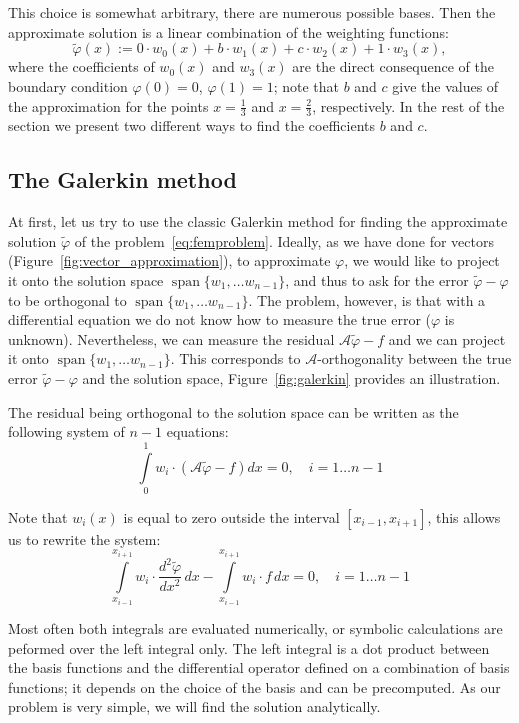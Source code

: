 \documentclass[notitlepage,oneside]{book}
\DeclareMathOperator{\Span}{span}
\begin{document}
This choice is somewhat arbitrary, there are numerous possible bases.
Then the approximate solution is a linear combination of the weighting functions:
\begin{equation}
\label{eq:tildephi}
\tilde{\varphi}(x) := 0\cdot w_0(x) + b\cdot w_1(x) + c\cdot w_2(x) + 1\cdot w_3(x),
\end{equation}
where the coefficients of $w_0(x)$ and $w_3(x)$ are the direct consequence of the boundary condition $\varphi(0)=0$, $\varphi(1)=1$;
note that $b$ and $c$ give the values of the approximation for the points $x=\frac{1}{3}$ and $x=\frac{2}{3}$, respectively.
In the rest of the section we present two different ways to find the coefficients $b$ and $c$.

\subsection{The Galerkin method}
At first, let us try to use the classic Galerkin method for finding the approximate solution $\tilde \varphi$ of the problem~\eqref{eq:femproblem}.
Ideally, as we have done for vectors (Figure~\ref{fig:vector_approximation}), to approximate $\varphi$, we would like to project it onto the solution space $\Span\{w_1,\dots w_{n-1}\}$,
and thus to ask for the error $\tilde\varphi - \varphi$ to be orthogonal to $\Span\{w_1,\dots w_{n-1}\}$.
The problem, however, is that with a differential equation we do not know how to measure the true error ($\varphi$ is unknown).
Nevertheless, we can measure the residual $\mathcal A\tilde{\varphi} - f$ and we can project it onto $\Span\{w_1,\dots w_{n-1}\}$.
This corresponds to $\mathcal A$-orthogonality between the true error $\tilde\varphi - \varphi$ and the solution space, Figure~\ref{fig:galerkin} provides an illustration.

The residual being orthogonal to the solution space can be written as the following system of $n-1$ equations:
\begin{equation}
\label{eq:galerkin}
\int\limits_0^1 w_i \cdot \left(\mathcal A\tilde{\varphi} - f\right) dx = 0, \quad i = 1\dots n-1 
\end{equation}

Note that $w_i(x)$ is equal to zero outside the interval $[x_{i-1}, x_{i+1}]$, this allows us to rewrite the system:
$$
\int\limits_{x_{i-1}}^{x_{i+1}} w_i \cdot \frac{d^2\tilde{\varphi}}{dx^2}\,dx - \int\limits_{x_{i-1}}^{x_{i+1}} w_i\cdot f\,dx = 0, \quad i = 1\dots n-1
$$

Most often both integrals are evaluated numerically, or symbolic calculations are peformed over the left integral only.
The left integral is a dot product between the basis functions and the differential operator defined on a combination of basis functions;
it depends on the choice of the basis and can be precomputed.
As our problem is very simple, we will find the solution analytically.
\end{document}
